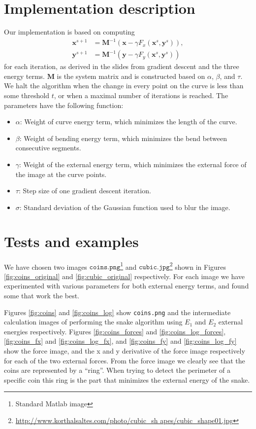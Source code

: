 \documentclass[11pt,a4paper]{article}
\begin{document}
\section{Implementation description}
%
Our implementation is based on computing
%
\begin{align}
\mathbf{x}^{s+1} &= \mathbf{M}^{-1} (\mathbf{x} - \gamma F_x(\mathbf{x}^s, \mathbf{y}^s)), \\
\mathbf{y}^{s+1} &= \mathbf{M}^{-1} (\mathbf{y} - \gamma F_y(\mathbf{x}^s, \mathbf{y}^s))
\end{align}
%
for each iteration, as derived in the slides from gradient descent and the three energy terms. $\mathbf{M}$ is the system matrix and is constructed based on $\alpha$, $\beta$, and $\tau$. We halt the algorithm when the change in every point on the curve is less than some threshold $t$, or when a maximal number of iterations is reached. The parameters have the following function:
%
\begin{itemize}
\item $\alpha$: Weight of curve energy term, which minimizes the length of the curve.
\item $\beta$: Weight of bending energy term, which minimizes the bend between consecutive segments.
\item $\gamma$: Weight of the external energy term, which minimizes the external force of the image at the curve points.
\item $\tau$: Step size of one gradient descent iteration.
\item $\sigma$: Standard deviation of the Gaussian function used to blur the image.
\end{itemize}
%
\section{Tests and examples}
%
We have chosen two images
$\texttt{coins.png}$\footnote{Standard Matlab image} and
$\texttt{cubic.jpg}$\footnote{\url{http://www.korthalsaltes.com/photo/cubic_sh
apes/cubic_shape01.jpg}} shown in Figures \ref{fig:coins_original} and
\ref{fig:cubic_original} respectively. For each image we have experimented
with various parameters for both external energy terms, and found some that
work the best.

Figures \ref{fig:coins} and \ref{fig:coins_log} show \texttt{coins.png} and the
intermediate calculation images of performing the snake algorithm using $E_1$ and $E_2$ external energies respectively.
Figures \ref{fig:coins_forces} and \ref{fig:coins_log_forces},
\ref{fig:coins_fx} and \ref{fig:coins_log_fx}, and \ref{fig:coins_fy} and
\ref{fig:coins_log_fy} show
the force image, and the x and y derivative of the force image respectively for
each of the two external forces.
From the force image we clearly see that the coins are represented by a
``ring''. When trying to detect the perimeter of a specific coin this ring is
the part that minimizes the external energy of the snake.
\end{document}
